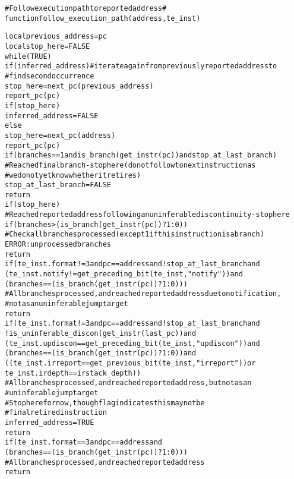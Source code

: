 \pagebreak

\begin{alltt}
# Follow execution path to reported address #
function follow_execution_path(address, te_inst)

  local previous_address = pc
  local stop_here        = FALSE
  while (TRUE)
    if (inferred_address) # iterate again from previously reported address to
                          #   find second occurrence
      stop_here = next_pc(previous_address)
      report_pc(pc)
      if (stop_here)
        inferred_address = FALSE
    else
      stop_here = next_pc(address)
      report_pc(pc)
      if (branches == 1 and is_branch(get_instr(pc)) and stop_at_last_branch)
        # Reached final branch - stop here (do not follow to next instruction as
        #  we do not yet know whether it retires)
        stop_at_last_branch = FALSE
        return
      if (stop_here)
        # Reached reported address following an uninferable discontinuity - stop here
        if (branches > (is_branch(get_instr(pc)) ? 1 : 0))
          # Check all branches processed (except 1 if this instruction is a branch)
          ERROR: unprocessed branches
        return
      if (te_inst.format != 3 and pc == address and !stop_at_last_branch and
        (te_inst.notify != get_preceding_bit(te_inst, "notify")) and 
        (branches == (is_branch(get_instr(pc)) ? 1 : 0)))
          # All branches processed, and reached reported address due to notification,
          # not as an uninferable jump target
        return
      if (te_inst.format != 3 and pc == address and !stop_at_last_branch and
        !is_uninferable_discon(get_instr(last_pc)) and 
        (te_inst.updiscon == get_preceding_bit(te_inst, "updiscon")) and 
        (branches == (is_branch(get_instr(pc)) ? 1 : 0)) and
        ((te_inst.irreport == get_previous_bit(te_inst, "irreport")) or 
         te_inst.irdepth == irstack_depth))
          # All branches processed, and reached reported address, but not as an
          #   uninferable jump target
          # Stop here for now, though flag indicates this may not be
          #  final retired instruction
        inferred_address = TRUE
        return
      if (te_inst.format == 3 and pc == address and
        (branches == (is_branch(get_instr(pc)) ? 1 : 0)))
        # All branches processed, and reached reported address
        return
\end{alltt}

\pagebreak

